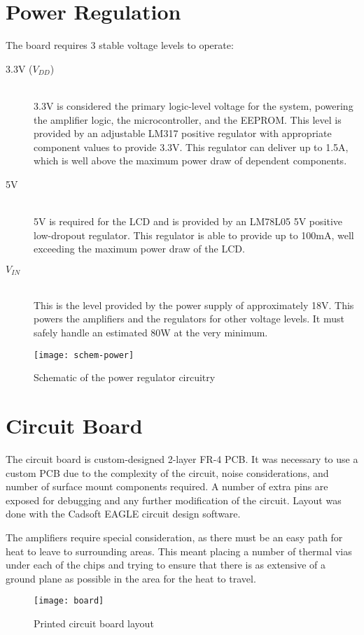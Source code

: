 \section{Power Regulation}
The board requires 3 stable voltage levels to operate:
\begin{description}
\item[3.3V ($V_{DD}$)] \hfill \\
3.3V is considered the primary logic-level voltage for the system, powering the amplifier logic, the microcontroller, and the EEPROM. This level is provided by an adjustable LM317 positive regulator with appropriate component values to provide 3.3V. This regulator can deliver up to 1.5A, which is well above the maximum power draw of dependent components. 
\item[5V] \hfill \\
5V is required for the LCD and is provided by an LM78L05 5V positive low-dropout regulator. This regulator is able to provide up to 100mA, well exceeding the maximum power draw of the LCD.
\item[$V_{IN}$] \hfill \\
This is the level provided by the power supply of approximately 18V. This powers the amplifiers and the regulators for other voltage levels. It must safely handle an estimated 80W at the very minimum.
\end{description}
\begin{figure}[H]
	\centering
	\texttt{[image: schem-power]}
	\caption[Power Regulation]%
	{Schematic of the power regulator circuitry}
\end{figure}

\section{Circuit Board}
The circuit board is custom-designed 2-layer FR-4 PCB. It was necessary to use a custom PCB due to the complexity of the circuit, noise considerations, and number of surface mount components required. A number of extra pins are exposed for debugging and any further modification of the circuit. Layout was done with the Cadsoft EAGLE circuit design software.

The amplifiers require special consideration, as there must be an easy path for heat to leave to surrounding areas. This meant placing a number of thermal vias under each of the chips and trying to ensure that there is as extensive of a ground plane as possible in the area for the heat to travel.
\begin{figure}[H]
	\centering
	\texttt{[image: board]}
	\caption[PCB Layout]%
	{Printed circuit board layout}
\end{figure}
